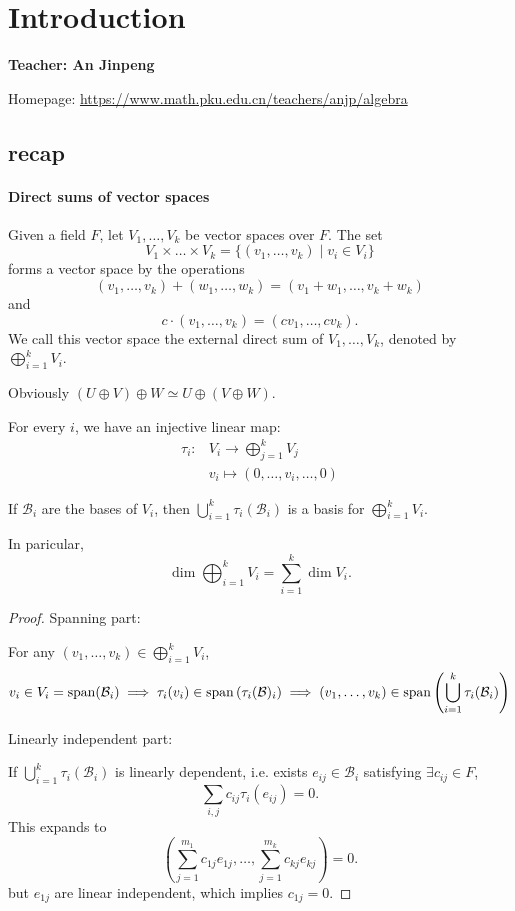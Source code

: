 \section{Introduction}
\label{sec:Introduction}
\begin{center}
	\sffamily\large\bfseries
	Teacher: An Jinpeng

	Homepage: \url{https://www.math.pku.edu.cn/teachers/anjp/algebra}
\end{center}

\subsection{recap}
\label{sub:recap}
\paragraph{Direct sums of vector spaces}
Given a field $F$, let $V_1,\dots,V_k$ be vector spaces over $F$.
The set
 \[
	V_1 \times \dots \times V_k = \{(v_1,\dots,v_k)\mid v_i\in V_i\}
\]
forms a vector space by the operations
\[
	(v_1,\dots,v_k) + (w_1,\dots,w_k) = (v_1+w_1,\dots,v_k+w_k)
\]
and
\[
c\cdot (v_1,\dots,v_k) = (cv_1,\dots,cv_k).
\]
We call this vector space the external direct sum of $V_1,\dots,V_k$,
denoted by $\bigoplus_{i=1}^k V_i$.

Obviously  $(U\oplus V)\oplus W\simeq U\oplus (V\oplus W)$.

For every $i$, we have an injective linear map:
 \begin{align*}
	\tau_i: &V_i \to \bigoplus_{j=1}^k V_j\\
	&v_i \mapsto (0,\dots,v_i,\dots,0)
\end{align*}
\begin{lemma}
	If $\mathcal{B}_i$ are the bases of $V_i$, then
	$\bigcup_{i=1}^k \tau_i(\mathcal{B}_i)$ is
	a basis for  $\bigoplus_{i=1}^k V_i$.

	In paricular,
	\[
		\dim \bigoplus_{i=1}^k V_i = \sum_{i=1}^k \dim V_i.
	\]
\end{lemma}
\begin{proof}[Proof]
    Spanning part:

	For any $(v_1,\dots,v_k)\in \bigoplus_{i=1}^kV_i$,
	\[
		v_i\in V_i = \operatorname{span}(\mathcal{B}_i)\implies
		\tau_i(v_i)\in \operatorname{span}\left(\tau_i(\mathcal{B})_i\right)\implies
		(v_1,\dots,v_k)\in \operatorname{span}\left(\bigcup_{i=1}^k \tau_i(\mathcal{B}_i)\right)
	\]

	Linearly independent part:

	If $\bigcup_{i=1}^k \tau_i(\mathcal{B}_i)$ is linearly dependent,
	i.e. exists $e_{ij}\in \mathcal{B}_i$ satisfying $\exists c_{ij}\in F$,
	\[
		\sum_{i,j} c_{ij} \tau_i(e_{ij}) = 0.
	\]
	This expands to
	\[
		\left( \sum_{j=1}^{m_1} c_{1j}e_{1j}, \dots, \sum_{j=1}^{m_k} c_{kj}e_{kj} \right)=0.
	\]
	but $e_{1j}$ are linear independent, which implies $c_{1j}=0$.
\end{proof}

